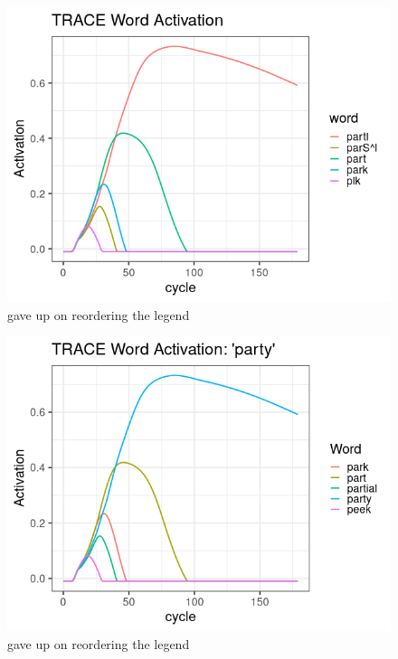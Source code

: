 \documentclass{beamer}
\begin{document}
\begin{frame}
\begin{figure}
\centering
\includegraphics[scale=0.5]{img/trace_plot.png}
\caption{gave up on reordering the legend}
\end{figure}
\end{frame}

\begin{frame}
\begin{figure}
\centering
\includegraphics[scale=0.5]{img/trace_plot_reg.png}
\caption{gave up on reordering the legend}
\end{figure}
\end{frame}
\end{document}
